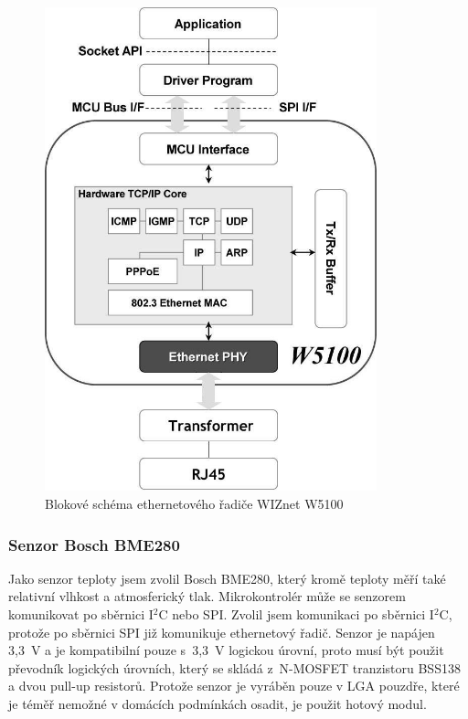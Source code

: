 \documentclass[12pt,a4paper]{article}
\begin{document}
\begin{figure}[H]
\centering
\label{fig:w5100-block-diagram}
\includegraphics[width = 96mm]{img/w5100-block-diagram.png}
\caption{Blokové schéma ethernetového řadiče WIZnet W5100}
\end{figure}

\newpage

\subsubsection{Senzor Bosch BME280}

Jako senzor teploty jsem zvolil Bosch BME280, který kromě teploty měří také relativní vlhkost a atmosferický tlak. Mikrokontrolér může se senzorem komunikovat po sběrnici I$^{2}$C nebo SPI. Zvolil jsem komunikaci po sběrnici I$^{2}$C, protože po sběrnici SPI již komunikuje ethernetový řadič. Senzor je napájen 3,3~V a je kompatibilní pouze s~3,3~V logickou úrovní, proto musí být použit převodník logických úrovních, který se skládá z~N-MOSFET tranzistoru BSS138 a dvou pull-up resistorů. Protože senzor je vyráběn pouze v LGA pouzdře, které je téměř nemožné v domácích podmínkách osadit, je použit hotový modul.
\end{document}
